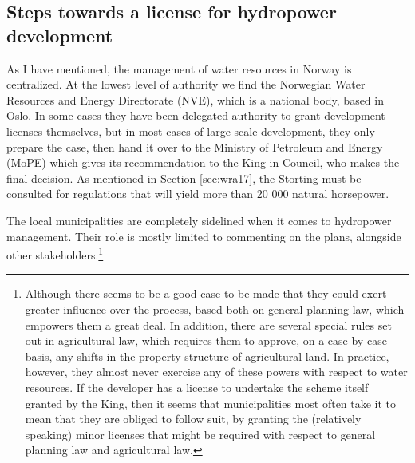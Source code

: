 %
%

\subsection{Steps towards a license for hydropower development}

As I have mentioned, the management of water resources in Norway is centralized. At the lowest level of authority we find the Norwegian Water Resources and Energy Directorate (NVE), which is a national body, based in Oslo. In some cases they have been delegated authority to grant development licenses themselves, but in most cases of large scale development, they only prepare the case, then hand it over to the Ministry of Petroleum and Energy (MoPE) which gives its recommendation to the King in Council, who makes the final decision. As mentioned in Section \ref{sec:wra17}, the Storting must be consulted for regulations that will yield more than 20 000 natural horsepower. 

The local municipalities are completely sidelined when it comes to hydropower management. Their role is mostly limited to commenting on the plans, alongside other stakeholders.\footnote{Although there seems to be a good case to be made that they could exert greater influence over the process, based both on general planning law, which empowers them a great deal. In addition, there are several special rules set out in agricultural law, which requires them to approve, on a case by case basis, any shifts in the property structure of agricultural land. In practice, however, they almost never exercise any of these powers with respect to water resources. If the developer has a license to undertake the scheme itself granted by the King, then it seems that municipalities most often take it to mean that they are obliged to follow suit, by granting the (relatively speaking) minor licenses that might be required with respect to general planning law and agricultural law.} %

